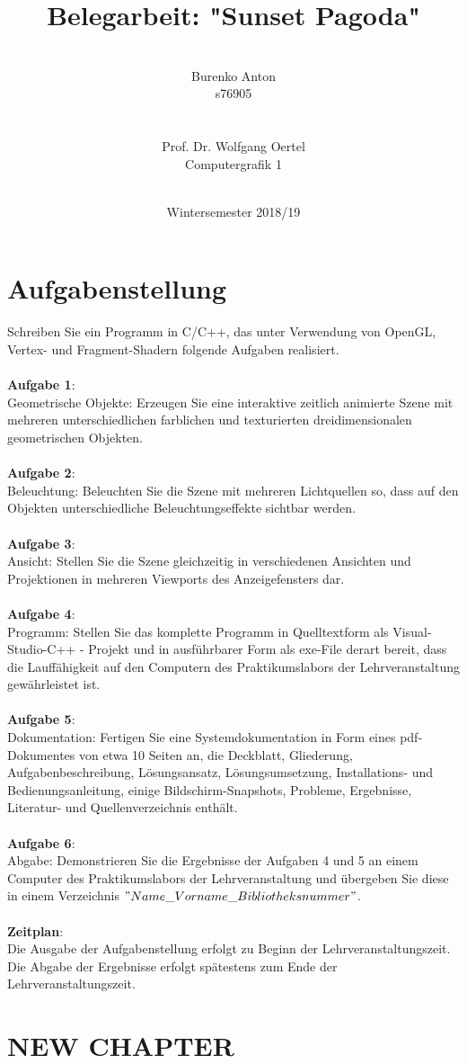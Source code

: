 \documentclass[12pt]{article}
\author{\\ Burenko Anton \\ s76905 \\ \\ \\ Prof. Dr. Wolfgang Oertel \\ 
Computergrafik 1 \\ \\
}
\date{Wintersemester 2018/19}
\title{Belegarbeit: "Sunset Pagoda"}
\begin{document}
\maketitle

\pagebreak

\tableofcontents

\pagebreak

\section{Aufgabenstellung}
Schreiben Sie ein Programm in C/C++, das unter Verwendung von OpenGL, Vertex- und
Fragment-Shadern folgende Aufgaben realisiert. \\ \\
\textbf{Aufgabe 1}: \\
Geometrische Objekte: Erzeugen Sie eine interaktive zeitlich animierte Szene mit mehreren
unterschiedlichen farblichen und texturierten dreidimensionalen geometrischen Objekten. \\ \\
\textbf{Aufgabe 2}: \\
Beleuchtung: Beleuchten Sie die Szene mit mehreren Lichtquellen so, dass auf den Objekten
unterschiedliche Beleuchtungseffekte sichtbar werden. \\ \\
\textbf{Aufgabe 3}: \\
Ansicht: Stellen Sie die Szene gleichzeitig in verschiedenen Ansichten und Projektionen in
mehreren Viewports des Anzeigefensters dar. \\ \\
\textbf{Aufgabe 4}: \\
Programm: Stellen Sie das komplette Programm in Quelltextform als Visual-Studio-C++ -
Projekt und in ausführbarer Form als exe-File derart bereit, dass die Lauffähigkeit auf den
Computern des Praktikumslabors der Lehrveranstaltung gewährleistet ist. \\ \\
\textbf{Aufgabe 5}: \\
Dokumentation: Fertigen Sie eine Systemdokumentation in Form eines pdf-Dokumentes von
etwa 10 Seiten an, die Deckblatt, Gliederung, Aufgabenbeschreibung, Lösungsansatz,
Lösungsumsetzung, Installations- und Bedienungsanleitung, einige Bildschirm-Snapshots,
Probleme, Ergebnisse, Literatur- und Quellenverzeichnis enthält. \\ \\
\textbf{Aufgabe 6}: \\
Abgabe: Demonstrieren Sie die Ergebnisse der Aufgaben 4 und 5 an einem Computer des
Praktikumslabors der Lehrveranstaltung und übergeben Sie diese in einem Verzeichnis
$"Name\_Vorname\_Bibliotheksnummer"$. \\ \\
\textbf{Zeitplan}: \\
Die Ausgabe der Aufgabenstellung erfolgt zu Beginn der Lehrveranstaltungszeit. Die Abgabe
der Ergebnisse erfolgt spätestens zum Ende der Lehrveranstaltungszeit. \\

\pagebreak

\section{NEW CHAPTER}
\end{document}
